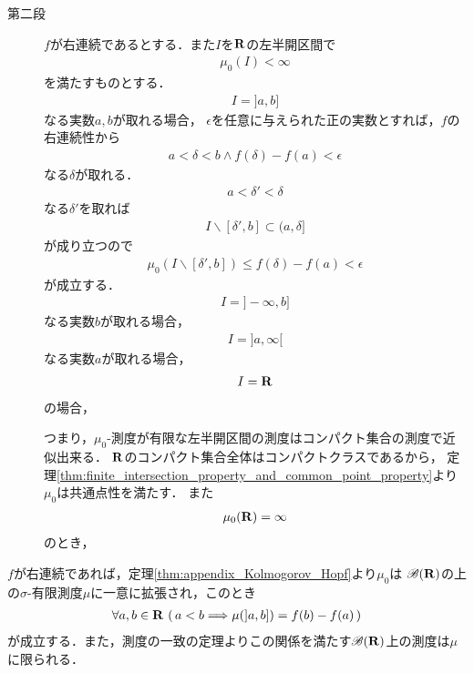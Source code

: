 \begin{prf}
\begin{description}
			\item[第二段]
				$f$が右連続であるとする．また$I$を$\mathbf{R}$の左半開区間で
				\begin{align}
					\mu_0(I) < \infty
				\end{align}
				を満たすものとする．
				\begin{align}
					I = ]a,b]
				\end{align}
				なる実数$a,b$が取れる場合，
				$\epsilon$を任意に与えられた正の実数とすれば，$f$の右連続性から
				\begin{align}
					a < \delta < b \wedge f(\delta) - f(a) < \epsilon
				\end{align}
				なる$\delta$が取れる．
				\begin{align}
					a < \delta' < \delta
				\end{align}
				なる$\delta'$を取れば
				\begin{align}
					I \backslash [\delta',b] \subset (a,\delta]
				\end{align}
				が成り立つので
				\begin{align}
					\mu_0\left( I \backslash [\delta',b] \right) \leq f(\delta) - f(a) < \epsilon
				\end{align}
				が成立する．
				\begin{align}
					I = ]-\infty,b]
				\end{align}
				なる実数$b$が取れる場合，
				\begin{align}
					I = ]a,\infty[
				\end{align}
				なる実数$a$が取れる場合，
				\begin{align}
					I = \mathbf{R}
				\end{align}
				の場合，
				
				
				つまり，$\mu_0$-測度が有限な左半開区間の測度はコンパクト集合の測度で近似出来る．
				$\mathbf{R}$のコンパクト集合全体はコンパクトクラスであるから，
				定理\ref{thm:finite_intersection_property_and_common_point_property}より$\mu_0$は共通点性を満たす．
				また
				\begin{align}
					\mu_0(\mathbf{R}) = \infty
				\end{align}
				のとき，
		\end{description}
	\end{prf}
	
	$f$が右連続であれば，定理\ref{thm:appendix_Kolmogorov_Hopf}より$\mu_0$は
	$\mathscr{B}(\mathbf{R})$の上の$\sigma$-有限測度$\mu$に一意に拡張され，このとき
	\begin{align}
		\forall a,b \in \mathbf{R}\, \left(\, a < b \Longrightarrow \mu(]a,b]) = f(b) - f(a)\, \right)
	\end{align}
	が成立する．また，測度の一致の定理よりこの関係を満たす$\mathscr{B}(\mathbf{R})$上の測度は$\mu$に限られる．
	
